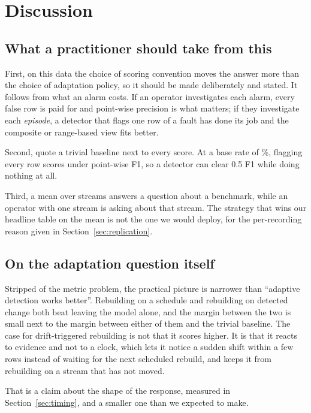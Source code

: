 \section{Discussion}

\subsection{What a practitioner should take from this}

First, on this data the choice of scoring convention moves the answer more than
the choice of adaptation policy, so it should be made deliberately and stated.
It follows from what an alarm costs. If an operator investigates each alarm,
every false row is paid for and point-wise precision is what matters; if they
investigate each \emph{episode}, a detector that flags one row of a fault has
done its job and the composite or range-based view fits better.

Second, quote a trivial baseline next to every score. At a base rate of
\BaseRate\%, flagging every row scores \FlagAll{} under point-wise F1, so a
detector can clear 0.5 F1 while doing nothing at all.

Third, a mean over streams answers a question about a benchmark, while an
operator with one stream is asking about that stream. The strategy that wins our
headline table on the mean is not the one we would deploy, for the per-recording
reason given in Section~\ref{sec:replication}.

\subsection{On the adaptation question itself}

Stripped of the metric problem, the practical picture is narrower than
``adaptive detection works better''. Rebuilding on a schedule and rebuilding on
detected change both beat leaving the model alone, and the margin between the
two is small next to the margin between either of them and the trivial
baseline. The case for drift-triggered rebuilding is not that it scores higher.
It is that it reacts to evidence and not to a clock, which lets it notice a
sudden shift within a few rows instead of waiting for the next scheduled
rebuild, and keeps it from rebuilding on a stream that has not moved.

That is a claim about the shape of the response, measured in
Section~\ref{sec:timing}, and a smaller one than we expected to make.

